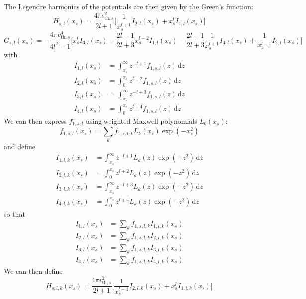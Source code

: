 \documentclass[11pt]{article}
\begin{document}
The Legendre harmonics of the potentials are then given by the Green's function:
\begin{equation}
H_{s,l}(x_s) = \frac{4\pi v_{\mathrm{th},s}^2}{2l+1}
\Bigg[\frac{1}{x_s^{l+1}} I_{2,l}(x_s) + x_s^l I_{1,l}(x_s) \Bigg]
\end{equation}
\begin{equation}
G_{s,l}(x_s) = -\frac{4\pi v_{\mathrm{th},s}^4}{4l^2-1}
\Bigg[ {x_s^l} I_{3,l}(x_s) - \frac{2l-1}{2l+3}x_s^{l+2} I_{1,l}(x_s)
- \frac{2l-1}{2l+3} \frac{1}{x_s^{l+1}} I_{4,l}(x_s)
+ \frac{1}{x_s^{l-1}} I_{2,l}(x_s) \Bigg]
\end{equation}
with
\begin{align}
I_{1,l}(x_s) &= \int_{x_s}^\infty z^{-l+1} f_{1,s,l}(z) \,\mathrm{d}z \\
I_{2,l}(x_s) &= \int_0^{x_s} z^{l+2} f_{1,s,l}(z) \,\mathrm{d}z \\
I_{3,l}(x_s) &= \int_{x_s}^\infty z^{-l+3} f_{1,s,l}(z) \,\mathrm{d}z \\
I_{4,l}(x_s) &= \int_0^{x_s} z^{l+4} f_{1,s,l}(z) \,\mathrm{d}z
\end{align}
We can then express $f_{1,s,l}$ using weighted Maxwell polynomials $L_k(x_s)$:
\begin{equation}
f_{1,s,l}(x_s) = \sum_k f_{1,s,l,k} L_k(x_s) \exp(-x_s^2)
\end{equation}
and define
\begin{align}
I_{1,l,k}(x_s) &= \int_{x_s}^\infty z^{-l+1} L_k(z) \exp(-z^2) \,\mathrm{d}z \\
I_{2,l,k}(x_s) &= \int_0^{x_s} z^{l+2} L_k(z) \exp(-z^2) \,\mathrm{d}z \\
I_{3,l,k}(x_s) &= \int_{x_s}^\infty z^{-l+3} L_k(z) \exp(-z^2) \,\mathrm{d}z \\
I_{4,l,k}(x_s) &= \int_0^{x_s} z^{l+4} L_k(z) \exp(-z^2) \,\mathrm{d}z
\end{align}
so that
\begin{align}
I_{1,l}(x_s) &= \sum_k f_{1,s,l,k} I_{1,l,k}(x_s) \\
I_{2,l}(x_s) &= \sum_k f_{1,s,l,k} I_{2,l,k}(x_s) \\
I_{3,l}(x_s) &= \sum_k f_{1,s,l,k} I_{3,l,k}(x_s) \\
I_{4,l}(x_s) &= \sum_k f_{1,s,l,k} I_{4,l,k}(x_s)
\end{align}
We can then define
\begin{equation}
H_{s,l,k}(x_s) = \frac{4\pi v_{\mathrm{th},s}^2}{2l+1}
\Bigg[\frac{1}{x_s^{l+1}} I_{2,l,k}(x_s) + x_s^l I_{1,l,k}(x_s) \Bigg]
\end{equation}
\end{document}

